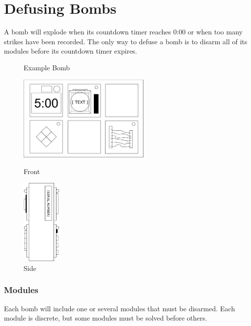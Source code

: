 \documentclass{../../ktane-mod}
\begin{document}
\section*{Defusing Bombs}
A bomb will explode when its countdown timer reaches 0:00 or when too many strikes have been recorded.
The only way to defuse a bomb is to disarm all of its modules before its countdown timer expires.

\begin{figure}[h]
  \centering
  \caption*{Example Bomb}
  \begin{minipage}{.4\textwidth}
    \centering
    \includegraphics[height=4.2cm]{images/bomb_front}
    \caption*{Front}
    \label{fig:sub1}
  \end{minipage}%
  \begin{minipage}{.3\textwidth}
    \centering
    \includegraphics[height=4.2cm]{images/bomb_side}
    \caption*{Side}
    \label{fig:sub2}
  \end{minipage}
\end{figure}

\subsubsection*{Modules}
Each bomb will include one or several modules that must be disarmed.
Each module is discrete, but some modules must be solved before others.
\end{document}
